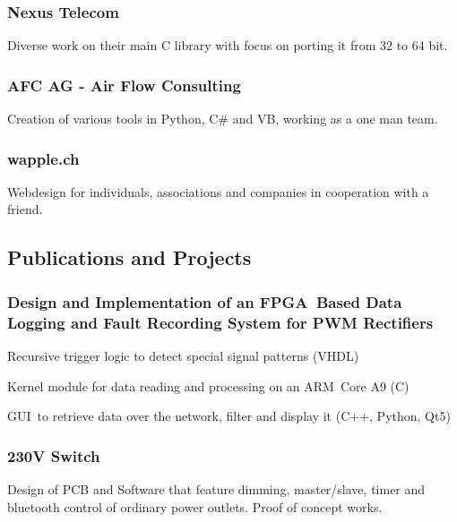 \documentclass[]{resume}
\begin{document}
\begin{timeline}
\subsubsection{Nexus Telecom}
Diverse work on their main C library with focus on porting it from 32 to 64 bit.
\sectionsep

\subsubsection{AFC AG - Air Flow Consulting}
Creation of various tools in Python, C\# and VB, working as a one man team.
\sectionsep

\subsubsection{wapple.ch}
Webdesign for individuals, associations and companies in cooperation with a friend.
\sectionsep


\subsection{Publications and Projects}

\subsubsection{Design and Implementation of an FPGA Based Data Logging and Fault Recording System for PWM Rectifiers}
\vspace{\topsep} %
\begin{tightemize}
\item Recursive trigger logic to detect special signal patterns (VHDL)
\item Kernel module for data reading and processing on an ARM Core A9 (C)
\item GUI to retrieve data over the network, filter and display it (C++, Python, Qt5)
\end{tightemize}
\sectionsep

\subsubsection{230V Switch}
Design of PCB and Software that feature dimming, master/slave, timer and bluetooth control of ordinary power outlets. Proof of concept works.
\sectionsep


\end{timeline}
\end{document}
